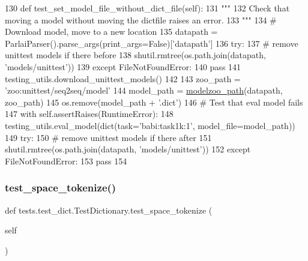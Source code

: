 \begin{DoxyCode}
130     \textcolor{keyword}{def }test\_set\_model\_file\_without\_dict\_file(self):
131         \textcolor{stringliteral}{"""}
132 \textcolor{stringliteral}{        Check that moving a model without moving the dictfile raises an error.}
133 \textcolor{stringliteral}{        """}
134         \textcolor{comment}{# Download model, move to a new location}
135         datapath = ParlaiParser().parse\_args(print\_args=\textcolor{keyword}{False})[\textcolor{stringliteral}{'datapath'}]
136         \textcolor{keywordflow}{try}:
137             \textcolor{comment}{# remove unittest models if there before}
138             shutil.rmtree(os.path.join(datapath, \textcolor{stringliteral}{'models/unittest'}))
139         \textcolor{keywordflow}{except} FileNotFoundError:
140             \textcolor{keywordflow}{pass}
141         testing\_utils.download\_unittest\_models()
142 
143         zoo\_path = \textcolor{stringliteral}{'zoo:unittest/seq2seq/model'}
144         model\_path = \hyperlink{namespaceparlai_1_1agents_1_1legacy__agents_1_1seq2seq_1_1utils__v0_a5fbd3301b67f00d6d146fb01c7cd7626}{modelzoo\_path}(datapath, zoo\_path)
145         os.remove(model\_path + \textcolor{stringliteral}{'.dict'})
146         \textcolor{comment}{# Test that eval model fails}
147         with self.assertRaises(RuntimeError):
148             testing\_utils.eval\_model(dict(task=\textcolor{stringliteral}{'babi:task1k:1'}, model\_file=model\_path))
149         \textcolor{keywordflow}{try}:
150             \textcolor{comment}{# remove unittest models if there after}
151             shutil.rmtree(os.path.join(datapath, \textcolor{stringliteral}{'models/unittest'}))
152         \textcolor{keywordflow}{except} FileNotFoundError:
153             \textcolor{keywordflow}{pass}
154 
\end{DoxyCode}
\mbox{\label{classtests_1_1test__dict_1_1TestDictionary_aa586d6cf97a48027ee00ed74234acb11}} 
\subsubsection{\texorpdfstring{test\+\_\+space\+\_\+tokenize()}{test\_space\_tokenize()}}
{\footnotesize\ttfamily def tests.\+test\+\_\+dict.\+Test\+Dictionary.\+test\+\_\+space\+\_\+tokenize (\begin{DoxyParamCaption}\item[{}]{self }\end{DoxyParamCaption})}

